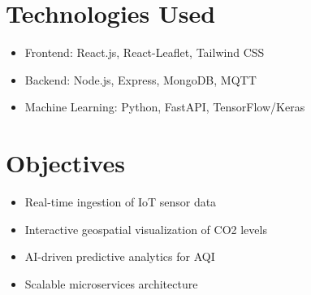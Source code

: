 \documentclass[a4paper, 12pt]{report}
\begin{document}
\section*{Technologies Used}
\begin{itemize}
    \item Frontend: React.js, React-Leaflet, Tailwind CSS
    \item Backend: Node.js, Express, MongoDB, MQTT
    \item Machine Learning: Python, FastAPI, TensorFlow/Keras
\end{itemize}
\section*{Objectives}
\begin{itemize}
    \item Real-time ingestion of IoT sensor data
    \item Interactive geospatial visualization of CO2 levels
    \item AI-driven predictive analytics for AQI
    \item Scalable microservices architecture
\end{itemize}
\newpage
\end{document}
